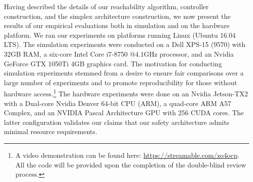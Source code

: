 \documentclass[manuscript,screen,review]{acmart}
\begin{document}




Having described the details of our reachability algorithm, controller construction, and the simplex architecture construction, we now present the results of our empirical evaluations both in simulation and on the hardware platform. We ran our experiments on platforms running Linux (Ubuntu 16.04 LTS). The simulation experiments were conducted on a Dell XPS-15 (9570) with 32GB RAM, a six-core Intel Core i7-8750 $@ 4.1\textrm{GHz}$ processor, and an Nvidia GeForce GTX 1050Ti 4GB graphics card. The motivation for conducting simulation experiments stemmed from a desire to ensure fair comparisons over a large number of experiments and to promote reproducibility for those without hardware access.\footnote{A video demonstration can be found here: \url{https://streamable.com/zo4ocp}. All the code will be provided upon the completion of the double-blind review process.} The hardware experiments were done on an Nvidia Jetson-TX2 with a Dual-core Nvidia Denver 64-bit CPU (ARM), a quad-core ARM A57 Complex, and an NVIDIA Pascal Architecture GPU with 256 CUDA cores. The latter configuration validates our claims that our safety architecture admits minimal resource requirements. 
\end{document}
